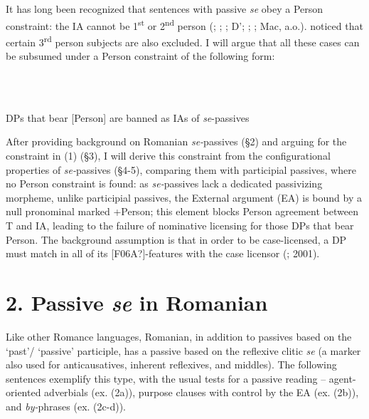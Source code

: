 \documentclass[output=paper]{langsci/langscibook}
\begin{document}
It has long been recognized that sentences with passive \textit{se} obey a Person constraint: the IA cannot be 1\textsuperscript{st} or 2\textsuperscript{nd} person (\citealt{Burzio1986}; \citealt{Cinque1988}; \citealt{Cornilescu1998}; D’\citealt{Alessandro2007}; \citealt{Mendikoetxea2008}; \citealt{Rezac2011}; Mac\citealt{Donald2017}, a.o.). \citet{Cornilescu1998} noticed that certain 3\textsuperscript{rd} person subjects are also excluded. I will argue that all these cases can be subsumed under a Person constraint of the following form:

\ea%
    \label{ex:key:1}
    \gll\\
        \\
    \glt
    \z

          DPs that bear [Person] are banned as IAs of \textit{se}{}-passives

After providing background on Romanian \textit{se-}passives (§2) and arguing for the constraint in (1) (§3), I will derive this constraint from the configurational properties of \textit{se-}passives (§4-5), comparing them with participial passives, where no Person constraint is found: as \textit{se-}passives lack a dedicated passivizing morpheme, unlike participial passives, the External argument (EA) is bound by a null pronominal marked +Person; this element blocks Person agreement between T and IA, leading to the failure of nominative licensing for those DPs that bear Person. The background assumption is that in order to be case-licensed, a DP must match in all of its [F06A?]-features with the case licensor (\citealt{Chomsky2000}; 2001).

\section{ 2. Passive \textit{se} in Romanian}

Like other Romance languages, Romanian, in addition to passives based on the ‘past’/ ‘passive’ participle, has a passive based on the reflexive clitic \textit{se} (a marker also used for anticausatives, inherent reflexives, and middles). The following sentences exemplify this type, with the usual tests for a passive reading – agent-oriented adverbials (ex. (2a)), purpose clauses with control by the EA (ex. (2b)), and \textit{by-}phrases (ex. (2c-d)).   

\ea%
    \label{ex:key:2}
    \gll\\
        \\
    \glt
    \z
\end{document}
